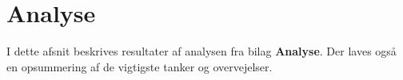 \documentclass[Rapport/Rapport_main.tex]{subfiles}
\begin{document}
\section{Analyse}\label{sec:rapport_analyse}
I dette afsnit beskrives resultater af analysen fra bilag \textbf{Analyse}. Der laves også en opsummering af de vigtigste tanker og overvejelser.
\end{document}
